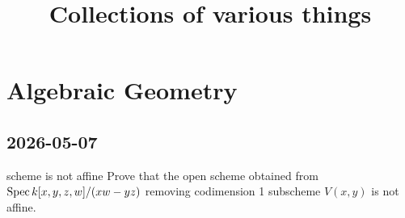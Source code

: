 \documentclass[12pt]{article}
\title{Collections of various things}
\begin{document}
\maketitle

\tableofcontents
\newpage 


\section{Algebraic Geometry}

\subsection{2026-05-07}

\begin{Topics}{scheme is not affine}
Prove that the open scheme obtained from \(\mathrm{Spec}\, k[x,y,z,w]/(xw-yz)\) removing codimension 1 subscheme \(V(x,y)\) is not affine. 
\end{Topics}
\end{document}
